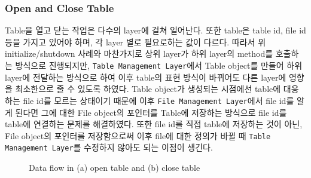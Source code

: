 \documentclass[main.tex]{subfiles}
\begin{document}
\subsubsection{Open and Close Table}
Table을 열고 닫는 작업은 다수의 layer에 걸쳐 일어난다. 또한 table은 table id, file id 등을 가지고 있어야 하며, 각 layer 별로 필요로하는 값이 다르다. 따라서 위 initialize/shutdown 사례와 마찬가지로 상위 layer가 하위 layer의 method를 호출하는 방식으로 진행되지만, \texttt{Table Management Layer}에서 Table object를 만들어 하위 layer에 전달하는 방식으로 하여 이후 table의 표현 방식이 바뀌어도 다른 layer에 영향을 최소한으로 줄 수 있도록 하였다. Table object가 생성되는 시점에선 table에 대응하는 file id를 모르는 상태이기 때문에 이후 \texttt{File Management Layer}에서 file id를 알게 된다면 그에 대한 File object의 포인터를 Table에 저장하는 방식으로 file id를 table에 연결하는 문제를 해결하였다. 또한 file id를 직접 table에 저장하는 것이 아닌, File object의 포인터를 저장함으로써 이후 file에 대한 정의가 바뀔 때 \texttt{Table Management Layer}를 수정하지 않아도 되는 이점이 생긴다.

\begin{figure}[!htb]
	\centering
	\caption{Data flow in (a) open table and (b) close table}
\end{figure}
\end{document}
